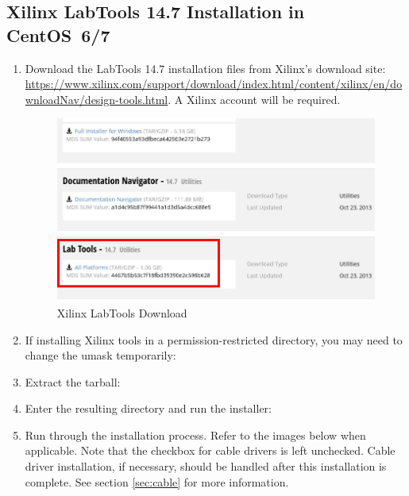 \begin{flushleft}
\subsection{Xilinx LabTools 14.7 Installation in CentOS~6/7}
\label{sec:labtools}
\begin{flushleft}
\begin{enumerate}
\item Download the LabTools 14.7 installation files from Xilinx's download site:
\url{https://www.xilinx.com/support/download/index.html/content/xilinx/en/downloadNav/design-tools.html}. A Xilinx account will be required.
\begin{figure}[H]
	\centerline{\includegraphics[scale=0.4]{figures/xilinx_labtools_download}}
	\caption{Xilinx LabTools Download}
\end{figure}
\item If installing Xilinx tools in a permission-restricted directory, you may need to change the umask temporarily:\newline
{}\newline
{}
\item Extract the tarball:\newline
{}
\item Enter the resulting directory and run the installer:\newline
{}\newline
{}\newline
\pagebreak
\item Run through the installation process. Refer to the images below when applicable. Note that the checkbox for cable drivers is left unchecked. Cable driver installation, if necessary, should be handled after this installation is complete. See section \ref{sec:cable} for more information.

\end{enumerate}
\end{flushleft}
\end{flushleft}
